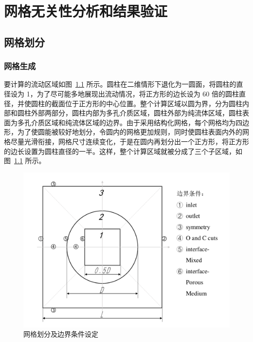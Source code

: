 \chapter{网格无关性分析和结果验证}\label{chap: validation}

\section{网格划分}\label{sec: grid}

\subsection{网格生成}

要计算的流动区域如图~\ref{fig: grid} 所示。圆柱在二维情形下退化为一圆面，将圆柱的直径设为 1，为了尽可能多地展现出流动情况，将正方形的边长设为 60 倍的圆柱直径，并使圆柱的截面位于正方形的中心位置。整个计算区域以圆为界，分为圆柱内部和圆柱外部两部分，圆柱内部为多孔介质区域，圆柱外部为纯流体区域，圆柱表面为多孔介质区域和纯流体区域的边界。由于采用结构化网格，每个网格均为四边形，为了使圆能被较好地划分，令圆内的网格更加规则，同时使圆柱表面内外的网格尽量光滑衔接，网格尺寸连续变化，于是在圆内再划分出一个正方形，将正方形的边长设置为圆柱直径的一半。这样，整个计算区域就被分成了三个子区域，如图~\ref{fig: grid} 所示。

\begin{figure}
	\centering
	\includegraphics[scale=.7]{figs/grid}
	\caption{网格划分及边界条件设定}\label{fig: grid}
\end{figure}

